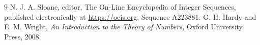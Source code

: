\documentclass[11pt,fleqn]{article}
\begin{document}
\begin{thebibliography}{9}
N. J. A. Sloane, editor, The On-Line Encyclopedia of Integer Sequences, published electronically at 
 \url{https://oeis.org}, Sequence A223881.
G. H. Hardy and E. M. Wright, \textit{An Introduction to the Theory of Numbers}, Oxford University Press, 2008.
\end{thebibliography}
\end{document}
